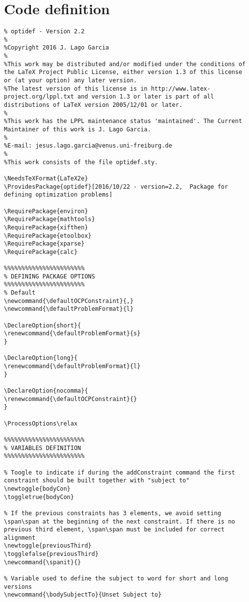 \documentclass[a4paper]{article}
\begin{document}
\section{Code definition}
\begin{lstlisting}
% optidef - Version 2.2
%
%Copyright 2016 J. Lago Garcia
%
%This work may be distributed and/or modified under the conditions of the LaTeX Project Public License, either version 1.3 of this license or (at your option) any later version.
%The latest version of this license is in http://www.latex-project.org/lppl.txt and version 1.3 or later is part of all distributions of LaTeX version 2005/12/01 or later.
%
%This work has the LPPL maintenance status 'maintained'. The Current Maintainer of this work is J. Lago Garcia.
%
%E-mail: jesus.lago.garcia@venus.uni-freiburg.de
%
%This work consists of the file optidef.sty.

\NeedsTeXFormat{LaTeX2e}
\ProvidesPackage{optidef}[2016/10/22 - version=2.2,  Package for defining optimization problems]

\RequirePackage{environ}
\RequirePackage{mathtools}	
\RequirePackage{xifthen}
\RequirePackage{etoolbox}	
\RequirePackage{xparse}	
\RequirePackage{calc}	

%%%%%%%%%%%%%%%%%%%%%%%
% DEFINING PACKAGE OPTIONS
%%%%%%%%%%%%%%%%%%%%%%%
% Default
\newcommand{\defaultOCPConstraint}{,}
\newcommand{\defaultProblemFormat}{l}

\DeclareOption{short}{
\renewcommand{\defaultProblemFormat}{s}
}

\DeclareOption{long}{
\renewcommand{\defaultProblemFormat}{l}
}

\DeclareOption{nocomma}{
\renewcommand{\defaultOCPConstraint}{}
}

\ProcessOptions\relax

%%%%%%%%%%%%%%%%%%%%%%%
% VARIABLES DEFINITION
%%%%%%%%%%%%%%%%%%%%%%%

% Toogle to indicate if during the addConstraint command the first constraint should be built together with "subject to"
\newtoggle{bodyCon}
\toggletrue{bodyCon}

% If the previous constraints has 3 elements, we avoid setting \span\span at the beginning of the next constraint. If there is no previous third element, \span\span must be included for correct alignment
\newtoggle{previousThird}
\togglefalse{previousThird}
\newcommand{\spanit}{}

% Variable used to define the subject to word for short and long versions
\newcommand{\bodySubjectTo}{Unset Subject to}


\end{lstlisting}
\end{document}
